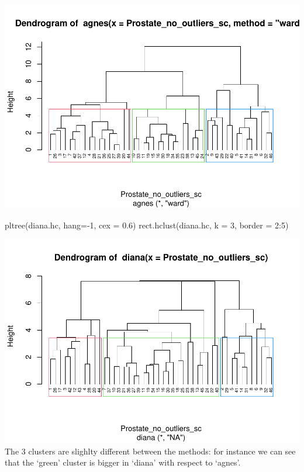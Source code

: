 \documentclass[
]{article}
\newenvironment{Shaded}{\begin{snugshade}}{\end{snugshade}}
\newcommand{\AttributeTok}[1]{\textcolor[rgb]{0.77,0.63,0.00}{#1}}
\newcommand{\DecValTok}[1]{\textcolor[rgb]{0.00,0.00,0.81}{#1}}
\newcommand{\FloatTok}[1]{\textcolor[rgb]{0.00,0.00,0.81}{#1}}
\newcommand{\FunctionTok}[1]{\textcolor[rgb]{0.00,0.00,0.00}{#1}}
\newcommand{\NormalTok}[1]{#1}
\newcommand{\SpecialCharTok}[1]{\textcolor[rgb]{0.00,0.00,0.00}{#1}}
\begin{document}
\includegraphics{clustering_files/figure-latex/unnamed-chunk-46-1.pdf}

\begin{Shaded}
\begin{Highlighting}[]
\FunctionTok{pltree}\NormalTok{(diana.hc, }\AttributeTok{hang=}\SpecialCharTok{{-}}\DecValTok{1}\NormalTok{, }\AttributeTok{cex =} \FloatTok{0.6}\NormalTok{)}
\FunctionTok{rect.hclust}\NormalTok{(diana.hc, }\AttributeTok{k =} \DecValTok{3}\NormalTok{, }\AttributeTok{border =} \DecValTok{2}\SpecialCharTok{:}\DecValTok{5}\NormalTok{)}
\end{Highlighting}
\end{Shaded}

\includegraphics{clustering_files/figure-latex/unnamed-chunk-46-2.pdf}
The 3 clusters are slighlty different between the methods: for instance
we can see that the `green' cluster is bigger in `diana' with respect to
`agnes'.
\end{document}
